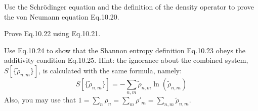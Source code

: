 \documentclass[boxes,pages]{homework}
\makeatletter
\numberwithin{@problem}{section}
\makeatother
\begin{document}
\begin{problem}
Use the Schr\"odinger equation and the definition of the density operator to prove the von Neumann equation Eq.10.20.
\end{problem}

\begin{problem}
Prove Eq.10.22 using Eq.10.21.
\end{problem}

\begin{problem}
Use Eq.10.24 to  show that the Shannon entropy definition Eq.10.23 obeys the additivity condition Eq.10.25. Hint: the ignorance about the combined system, $S[\{\tilde{\rho}_{n,m}\}]$, is calculated with the same formula, namely:
\[
	S[\{\tilde{\rho}_{n,m}\}] = -\sum_{n, m}\tilde{\rho}_{n, m}\ln(\tilde{\rho}_{n,m})
\]
Also, you may use that $1 = \sum_n \rho_n = \sum_m\rho'_m = \sum_{n, m}\tilde{\rho}_{n,m}$.
\end{problem}
\begin{solution}
\end{solution}
\end{document}
